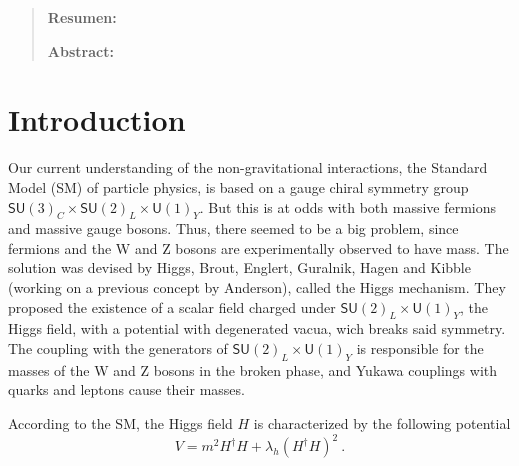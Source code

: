 \documentclass[aps,prd,preprintnumbers,nofootinbibn,twocolumn]{revtex4}
\begin{document}
\maketitle

\begin{widetext}
\begin{quotation}

{\bf Resumen:}\\



\vspace{2cm}

{\bf Abstract:}\\



\vspace{2cm}
\end{quotation}
\end{widetext}
\tableofcontents


\vspace{5cm}




\newpage
\clearpage

\section{Introduction}
Our current understanding of the non-gravitational interactions, the Standard Model (SM) of particle physics, is based on a gauge chiral symmetry group $\mathsf{SU}(3)_C \times \mathsf{SU}(2)_L \times \mathsf{U}(1)_Y $. But this is at odds with both massive fermions and massive gauge bosons. Thus, there seemed to be a big problem, since fermions and the W and Z bosons are experimentally observed to have mass. The solution was devised by Higgs, Brout, Englert, Guralnik, Hagen and Kibble (working on a previous concept by Anderson), called the Higgs mechanism. They proposed the existence of a scalar field charged under $\mathsf{SU}(2)_L \times \mathsf{U}(1)_Y$, the Higgs field, with a potential with degenerated vacua, wich breaks said symmetry. The coupling with the generators of $\mathsf{SU}(2)_L \times \mathsf{U}(1)_Y$ is responsible for the masses of the W and Z bosons in the broken phase, and Yukawa couplings with quarks and leptons cause their masses. 


According to the SM, the Higgs field $H$ is characterized by the following potential
\begin{equation}\label{eq:HiggsPotential}
V = m^2 H^\dagger H + \lambda_h (H^\dagger H)^2\ .
\end{equation}
\end{document}
